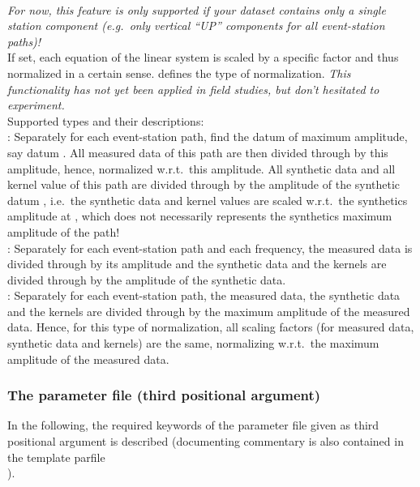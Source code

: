 \paragraph{}
\emph{For now, this feature is only supported if your dataset contains only a single station component 
(e.g.\ only vertical ``UP'' components for all event-station paths)!}\\
If set, each equation of the linear system is scaled by a specific factor and thus normalized in a certain sense.
 defines the type of normalization. \emph{This 
functionality has not yet been applied in field studies, but don't hesitated to experiment.}\\
Supported types and their descriptions:\\
\textbf{}: Separately for each event-station path, find the datum of maximum amplitude, say
datum . All 
measured data of this path are then divided through by this amplitude, hence, normalized w.r.t.\ this amplitude.
All synthetic data and all kernel value of this path are divided through by the amplitude of the synthetic datum
 , i.e.\ the synthetic data and kernel values are scaled w.r.t.\ the synthetics amplitude at 
, which does not necessarily represents the synthetics maximum amplitude of the path!\\
\textbf{}: Separately for each event-station path and each frequency,
the measured data is divided through by its amplitude and the synthetic data and the kernels are divided through
by the amplitude of the synthetic data.\\
\textbf{}: Separately for each event-station path, the measured data, the synthetic
data and the kernels are divided through by the maximum amplitude of the measured data. Hence, for this type of 
normalization, all scaling factors (for measured data, synthetic data and kernels) are the same, normalizing 
w.r.t.\ the maximum amplitude of the measured data.
\subsubsection{The parameter file  (third positional argument)}
In the following, the required keywords of the parameter file given as third positional argument is described 
(documenting commentary is also contained in the template parfile\\
).

